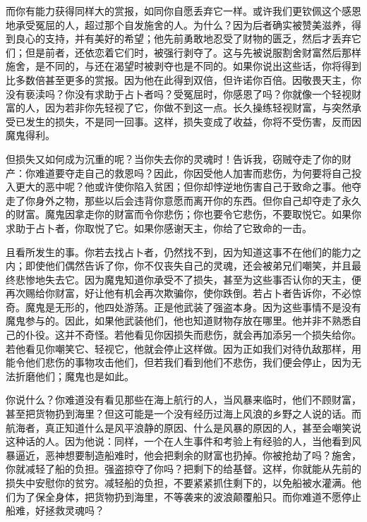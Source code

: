 而你有能力获得同样大的赏报，如同你自愿丢弃它一样。或许我们更钦佩这个感恩地承受冤屈的人，超过那个自发施舍的人。为什么？因为后者确实被赞美滋养，得到良心的支持，并有美好的希望；他先前勇敢地忍受了财物的匮乏，然后才丢弃它们；但是前者，还依恋着它们时，被强行剥夺了。这与先被说服割舍财富然后那样施舍，是不同的，与还在渴望时被剥夺也是不同的。如果你说出这些话，你将得到比多数倍甚至更多的赏报。因为他在此得到双倍，但许诺你百倍。因敬畏天主，你没有亵渎吗？你没有求助于占卜者吗？受冤屈时，你感恩了吗？你就像一个轻视财富的人，因为若非你先轻视了它，你做不到这一点。长久操练轻视财富，与突然承受已发生的损失，不是同一回事。这样，损失变成了收益，你将不受伤害，反而因魔鬼得利。\par

但损失又如何成为沉重的呢？当你失去你的灵魂时！告诉我，窃贼夺走了你的财产：你难道要夺走自己的救恩吗？因此，你因受他人加害而悲伤，为何要将自己投入更大的恶中呢？他或许使你陷入贫困；但你却悖逆地伤害自己于致命之事。他夺走了你身外之物，那些以后会违背你意愿而离开你的东西。但你自己却夺走了永久的财富。魔鬼因拿走你的财富而令你悲伤；你也要令它悲伤，不要取悦它。如果你求助于占卜者，你取悦了它。如果你感谢天主，你给了它致命的一击。\par

且看所发生的事。你若去找占卜者，仍然找不到，因为知道这事不在他们的能力之内；即使他们偶然告诉了你，你不仅丧失自己的灵魂，还会被弟兄们嘲笑，并且最终悲惨地失去它。因为魔鬼知道你承受不了损失，甚至为这些事否认你的天主，便再次赐给你财富，好让他有机会再次欺骗你，使你跌倒。若占卜者告诉你，不必惊奇。魔鬼是无形的，他四处游荡。正是他武装了强盗本身。因为这些事情不是没有魔鬼参与的。因此，如果他武装他们，他也知道财物存放在哪里。他并非不熟悉自己的仆役。这并不奇怪。若他看见你因损失而悲伤，就会再加添另一个损失给你。若他看见你嘲笑它、轻视它，他就会停止这样做。因为正如我们对待仇敌那样，用能令他们悲伤的事物攻击他们，但若我们看到他们不悲伤，我们便会停止，因为无法折磨他们；魔鬼也是如此。\par

你说什么？你难道没有看见那些在海上航行的人，当风暴来临时，他们不顾财富，甚至把货物扔到海里？但这可能是一个没有经历过海上风浪的乡野之人说的话。而航海者，真正知道什么是风平浪静的原因、什么是风暴的原因的人，甚至会嘲笑说这种话的人。因为他说：同样，一个在人生事件和考验上有经验的人，当他看到风暴逼近，恶神想要制造船难时，他会把剩余的财富也扔掉。你被抢劫了吗？施舍，你就减轻了船的负担。强盗掠夺了你吗？把剩下的给基督。这样，你就能从先前的损失中安慰你的贫穷。减轻船的负担，不要紧紧抓住剩下的，以免船被水灌满。他们为了保全身体，把货物扔到海里，不等袭来的波浪颠覆船只。而你难道不愿停止船难，好拯救灵魂吗？\par

